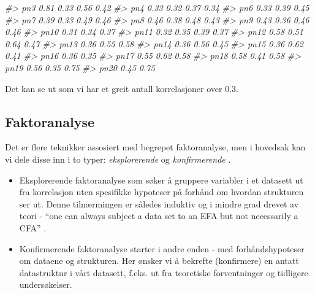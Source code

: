 \documentclass[
]{article}
\newenvironment{Shaded}{\begin{snugshade}}{\end{snugshade}}
\newcommand{\CommentTok}[1]{\textcolor[rgb]{0.56,0.35,0.01}{\textit{#1}}}
\providecommand{\tightlist}{%
  \setlength{\itemsep}{0pt}\setlength{\parskip}{0pt}}
\begin{document}
\begin{Shaded}
\begin{Highlighting}[]
\CommentTok{\#\textgreater{} pn3       0.81      0.33           0.56 0.42}
\CommentTok{\#\textgreater{} pn4  0.33      0.32      0.37 0.34          }
\CommentTok{\#\textgreater{} pn6  0.33                0.39 0.45          }
\CommentTok{\#\textgreater{} pn7  0.39      0.33      0.49 0.46          }
\CommentTok{\#\textgreater{} pn8       0.46      0.38           0.48 0.43}
\CommentTok{\#\textgreater{} pn9  0.43      0.36      0.46 0.46          }
\CommentTok{\#\textgreater{} pn10                0.31           0.34 0.37}
\CommentTok{\#\textgreater{} pn11      0.32      0.35           0.39 0.37}
\CommentTok{\#\textgreater{} pn12 0.58      0.51      0.64 0.47          }
\CommentTok{\#\textgreater{} pn13           0.36      0.55 0.58          }
\CommentTok{\#\textgreater{} pn14                0.36           0.56 0.45}
\CommentTok{\#\textgreater{} pn15 0.36                0.62 0.41          }
\CommentTok{\#\textgreater{} pn16      0.36                     0.35     }
\CommentTok{\#\textgreater{} pn17 0.55      0.62           0.58          }
\CommentTok{\#\textgreater{} pn18 0.58      0.41      0.58               }
\CommentTok{\#\textgreater{} pn19      0.56      0.35                0.75}
\CommentTok{\#\textgreater{} pn20      0.45                     0.75}
\end{Highlighting}
\end{Shaded}

Det kan se ut som vi har et greit antall korrelasjoner over 0.3.

\hypertarget{faktoranalyse}{%
\subsection{Faktoranalyse}\label{faktoranalyse}}

Det er flere teknikker assosiert med begrepet faktoranalyse, men i hovedsak kan vi dele disse inn i to typer: \emph{eksplorerende} og \emph{konfirmerende} \citep{hoyleConfirmatoryFactorAnalysis2000, hurleyExploratoryConfirmatoryFactor1997}.

\begin{itemize}
\tightlist
\item
  Eksplorerende faktoranalyse som søker å gruppere variabler i et datasett ut fra korrelasjon uten spesifikke hypoteser på forhånd om hvordan strukturen ser ut. Denne tilnærmingen er således induktiv og i mindre grad drevet av teori - ``one can always subject a data set to an EFA but not necessarily a CFA'' \citep[Schriesheim i][s.672]{hurleyExploratoryConfirmatoryFactor1997}.
\item
  Konfirmerende faktoranalyse starter i andre enden - med forhåndshypoteser om dataene og strukturen. Her ønsker vi å bekrefte (konfirmere) en antatt datastruktur i vårt datasett, f.eks. ut fra teoretiske forventninger og tidligere undersøkelser.
\end{itemize}
\end{document}
